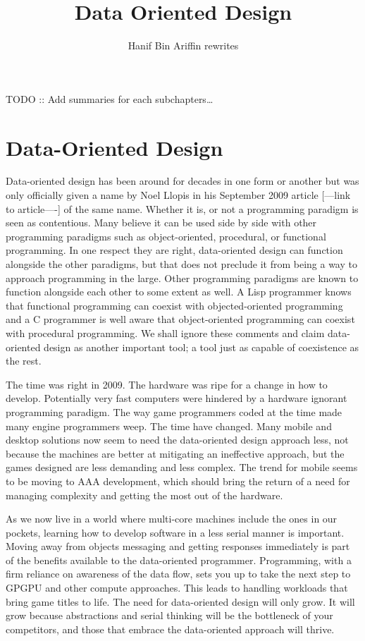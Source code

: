 \documentclass[a4paper,12pt]{article}
\author{Hanif Bin Ariffin rewrites}
\title{Data Oriented Design}
\begin{document}
\maketitle
\tableofcontents

TODO :: Add summaries for each subchapters\dots
\newpage
\section{Data-Oriented Design}

Data-oriented design has been around for decades in one form or another but was only officially given a name by Noel Llopis in his September 2009 article [---link to article----] of the same name.
Whether it is, or not a programming paradigm is seen as contentious.
Many believe it can be used side by side with other programming paradigms such as object-oriented, procedural, or functional programming.
In one respect they are right, data-oriented design can function alongside the other paradigms, but that does not preclude it from being a way to approach programming in the large.
Other programming paradigms are known to function alongside each other to some extent as well.
A Lisp programmer knows that functional programming can coexist with objected-oriented programming and a C programmer is well aware that object-oriented programming can coexist with procedural programming.
We shall ignore these comments and claim data-oriented design as another important tool;
a tool just as capable of coexistence as the rest.

The time was right in 2009.
The hardware was ripe for a change in how to develop.
Potentially very fast computers were hindered by a hardware ignorant programming paradigm.
The way game programmers coded at the time made many engine programmers weep.
The time have changed.
Many mobile and desktop solutions now seem to need the data-oriented design approach less, not because the machines are better at mitigating an ineffective approach, but the games designed are less demanding and less complex.
The trend for mobile seems to be moving to AAA development, which should bring the return of a need for managing complexity and getting the most out of the hardware.

As we now live in a world where multi-core machines include the ones in our pockets, learning how to develop software in a less serial manner is important.
Moving away from objects messaging and getting responses immediately is part of the benefits available to the data-oriented programmer.
Programming, with a firm reliance on awareness of the data flow, sets you up to take the next step to GPGPU and other compute approaches.
This leads to handling workloads that bring game titles to life.
The need for data-oriented design will only grow.
It will grow because abstractions and serial thinking will be the bottleneck of your competitors, and those that embrace the data-oriented approach will thrive.
\end{document}
